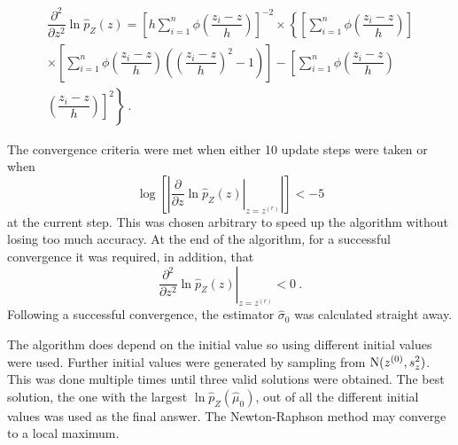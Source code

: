 \begin{multline}
  \dfrac{
    \partial^2
  }
  {
    \partial z^2
  }
  \ln\widehat{p}_Z(z)
  =
  \left[
    h\sum_{i=1}^n
    \phi\left(
      \dfrac{
        z_i-z
      }
      {
        h
      }
    \right)
  \right]^{-2}
  \times
  \left\{
    \left[
      \sum_{i=1}^n
      \phi\left(
        \dfrac{
          z_i-z
        }
        {
          h
        }
      \right)
    \right]
  \right.
  \\
  \left.
    \times
    \left[
      \sum_{i=1}^n
      \phi\left(
        \dfrac{
          z_i-z
        }
        {
          h
        }
      \right)
      \left(
        \left(
          \dfrac{
            z_i-z
          }
          {
            h
          }
        \right)^2
        -1
      \right)
    \right]
    -
    \left[
      \sum_{i=1}^n
      \phi\left(
        \dfrac{
          z_i-z
        }
        {
          h
        }
      \right)
    \right.
  \right.
  \\
  \left.
    \left.
      \left(
        \dfrac{
          z_i-z
        }
        {
          h
        }
      \right)
    \right]^2
  \right\}
  \ .
\end{multline}

The convergence criteria were met when either 10 update steps were taken or when
\begin{equation}
  \log\left[\left|
    \left.
    \dfrac{
      \partial
    }
    {
      \partial z
    }
  \ln\widehat{p}_Z(z)
  \right|_{z=z^{(r)}}
  \right|\right]
  <-5
\end{equation}
at the current step. This was chosen arbitrary to speed up the algorithm without losing too much accuracy. At the end of the algorithm, for a successful convergence it was required, in addition, that
\begin{equation}
  \left.
    \dfrac{
      \partial^2
    }
    {
      \partial z^2
    }
    \ln\widehat{p}_Z(z)
  \right|_{z=z^{(r)}}
  < 0 \ .
\end{equation}
Following a successful convergence, the estimator $\widehat{\sigma}_0$ was calculated straight away.

The algorithm does depend on the initial value so using different initial values were used. Further initial values were generated by sampling from $\operatorname{N}(z^{(0)}, s_z^2)$. This was done multiple times until three valid solutions were obtained. The best solution, the one with the largest $\ln\widehat{p}_Z\left(\widehat{\mu}_0\right)$, out of all the different initial values was used as the final answer. The Newton-Raphson method may converge to a local maximum. 

